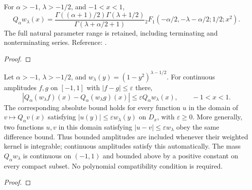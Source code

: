 \begin{supporting}
\begin{theorem}
\label{thm:power-law-hypergeometric-symmetric}
\leanok
For $\alpha>-1$, $\lambda>-1/2$, and $-1<x<1$,
\[
 Q_\alpha w_\lambda(x)=
 \frac{\Gamma((\alpha+1)/2)\Gamma(\lambda+1/2)}
      {\Gamma(\lambda+\alpha/2+1)}
 {}_2F_1(-\alpha/2,-\lambda-\alpha/2;1/2;x^2).
\]
  The full natural parameter range is
retained, including terminating and nonterminating series.
Reference: \cite[Section 2]{gutleb-carrillo-olver}.
\end{theorem}
\begin{proof}
\leanok
\end{proof}


\begin{theorem}
\label{thm:power-law-stability}
\leanok
Let $\alpha>-1$, $\lambda>-1/2$, and $w_\lambda(y)=(1-y^2)^{\lambda-1/2}$.
For continuous amplitudes $f,g$ on $[-1,1]$ with $|f-g|\le\varepsilon$ there,
\[
 |Q_\alpha(w_\lambda f)(x)-Q_\alpha(w_\lambda g)(x)|
 \le \varepsilon Q_\alpha w_\lambda(x),\qquad -1<x<1.
\]
The corresponding absolute bound holds for every function $u$ in the
domain of $v\mapsto Q_\alpha v(x)$ satisfying $|u(y)|\le\varepsilon w_\lambda(y)$
on $D_x$, with $\varepsilon\ge0$. More generally, two functions $u,v$ in this domain
satisfying $|u-v|\le\varepsilon w_\lambda$ obey the same difference bound.
Thus bounded amplitudes are included whenever their weighted kernel is
integrable; continuous amplitudes satisfy this automatically. The mass $Q_\alpha w_\lambda$ is continuous on $(-1,1)$
and bounded above by a positive constant on every compact subset.
No polynomial compatibility condition is required.
\end{theorem}
\begin{proof}
\leanok
\end{proof}


\end{supporting}
